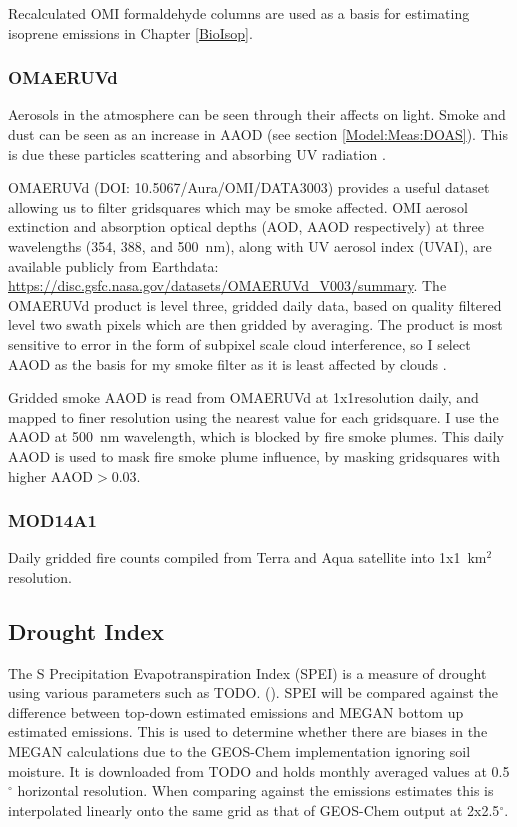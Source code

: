       Recalculated OMI formaldehyde columns are used as a basis for estimating isoprene emissions in Chapter \ref{BioIsop}.
    
    \subsubsection{OMAERUVd}
      \label{Model:Datasets:OMAERUVd}
      
      Aerosols in the atmosphere can be seen through their affects on light. 
      Smoke and dust can be seen as an increase in AAOD (see section \ref{Model:Meas:DOAS}).
      This is due these particles scattering and absorbing UV radiation \parencite{Ahn2008}.
      
      
      OMAERUVd (DOI: 10.5067/Aura/OMI/DATA3003) provides a useful dataset allowing us to filter gridsquares which may be smoke affected.
      OMI aerosol extinction and absorption optical depths (AOD, AAOD respectively) at three wavelengths (354, 388, and 500~nm), along with UV aerosol index (UVAI), are available publicly from Earthdata: \url{https://disc.gsfc.nasa.gov/datasets/OMAERUVd_V003/summary}.
      The OMAERUVd product is level three, gridded daily data, based on quality filtered level two swath pixels which are then gridded by averaging.
      The product is most sensitive to error in the form of subpixel scale cloud interference, so I select AAOD as the basis for my smoke filter as it is least affected by clouds \parencite{Ahn2008}.
      
      Gridded smoke AAOD is read from OMAERUVd at 1x1\degr resolution daily, and mapped to finer resolution using the nearest value for each gridsquare.
      I use the AAOD at 500~nm wavelength, which is blocked by fire smoke plumes.
      This daily AAOD is used to mask fire smoke plume influence, by masking gridsquares with higher AAOD$>0.03$.
    
    \subsubsection{MOD14A1}
      \label{Model:Datasets:MOD14A1}
      Daily gridded fire counts compiled from Terra and Aqua satellite into 1x1~km$^2$ resolution.
  
  \subsection{Drought Index}
    The S Precipitation Evapotranspiration Index (SPEI) is a measure of drought using various parameters such as TODO. (\textcite{Wang2017}).
    SPEI will be compared against the difference between top-down estimated emissions and MEGAN bottom up estimated emissions. 
    This is used to determine whether there are biases in the MEGAN calculations due to the GEOS-Chem implementation ignoring soil moisture.
    It is downloaded from TODO and holds monthly averaged values at 0.5$^{\circ}$ horizontal resolution.
    When comparing against the emissions estimates this is interpolated linearly onto the same grid as that of GEOS-Chem output at 2x2.5$^{\circ}$.
    
